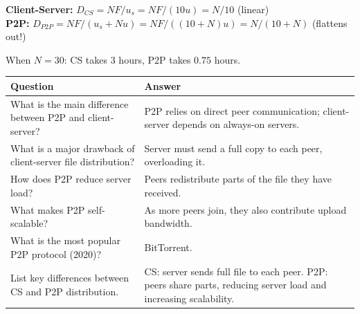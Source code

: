 \begin{center}
\end{center}

\begin{warnbox}[{{Example: $u_s = 10u$, $F/u = 1$ hour, $d_{\min} \geq u_s$}}]
\textbf{Client-Server:} $D_{CS} = NF/u_s = NF/(10u) = N/10$ (linear)\\
\textbf{P2P:} $D_{P2P} = NF/(u_s + Nu) = NF/((10+N)u) = N/(10+N)$ (flattens out!)

When $N=30$: CS takes $3$ hours, P2P takes $0.75$ hours.
\end{warnbox}

\begin{imagebox}
\end{imagebox}

\begin{exambox}
\small
\begin{longtable}{p{7cm}p{7cm}}
\toprule
\textbf{Question} & \textbf{Answer} \\
\midrule
\endhead
What is the main difference between P2P and client-server? & P2P relies on direct peer communication; client-server depends on always-on servers. \\
\midrule
What is a major drawback of client-server file distribution? & Server must send a full copy to each peer, overloading it. \\
\midrule
How does P2P reduce server load? & Peers redistribute parts of the file they have received. \\
\midrule
What makes P2P self-scalable? & As more peers join, they also contribute upload bandwidth. \\
\midrule
What is the most popular P2P protocol (2020)? & BitTorrent. \\
\midrule
List key differences between CS and P2P distribution. & CS: server sends full file to each peer. P2P: peers share parts, reducing server load and increasing scalability. \\
\bottomrule
\end{longtable}
\end{exambox}


